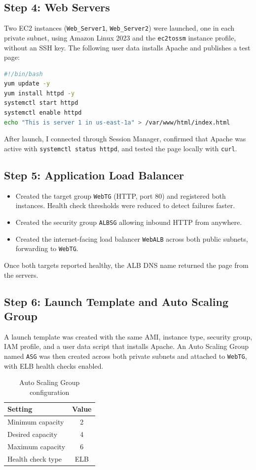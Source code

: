 \documentclass[11pt,a4paper]{article}
\begin{document}
\subsection{Step 4: Web Servers}
Two EC2 instances (\texttt{Web\_Server1}, \texttt{Web\_Server2}) were launched, one in each private subnet, using Amazon Linux 2023 and the \texttt{ec2tossm} instance profile, without an SSH key. The following user data installs Apache and publishes a test page:

\begin{lstlisting}[language=bash]
#!/bin/bash
yum update -y
yum install httpd -y
systemctl start httpd
systemctl enable httpd
echo "This is server 1 in us-east-1a" > /var/www/html/index.html
\end{lstlisting}

After launch, I connected through Session Manager, confirmed that Apache was active with \texttt{systemctl status httpd}, and tested the page locally with \texttt{curl}.


\subsection{Step 5: Application Load Balancer}
\begin{itemize}
  \item Created the target group \texttt{WebTG} (HTTP, port 80) and registered both instances. Health check thresholds were reduced to detect failures faster.
  \item Created the security group \texttt{ALBSG} allowing inbound HTTP from anywhere.
  \item Created the internet-facing load balancer \texttt{WebALB} across both public subnets, forwarding to \texttt{WebTG}.
\end{itemize}
Once both targets reported healthy, the ALB DNS name returned the page from the servers.


\subsection{Step 6: Launch Template and Auto Scaling Group}
A launch template was created with the same AMI, instance type, security group, IAM profile, and a user data script that installs Apache. An Auto Scaling Group named \texttt{ASG} was then created across both private subnets and attached to \texttt{WebTG}, with ELB health checks enabled.

\begin{table}[H]
\centering
\renewcommand{\arraystretch}{1.25}
\begin{tabular}{l c}
\toprule
\textbf{Setting} & \textbf{Value} \\
\midrule
Minimum capacity & 2 \\
Desired capacity & 4 \\
Maximum capacity & 6 \\
Health check type & ELB \\
\bottomrule
\end{tabular}
\caption{Auto Scaling Group configuration}
\end{table}
\end{document}
